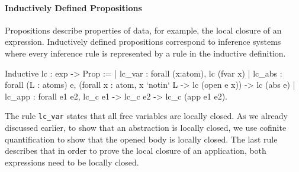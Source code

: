 \documentclass[a4paper, 11pt, fleqn]{scrreprt}
\newcommand{\coqinline}[1]{\texttt{#1}}
\begin{document}
	\paragraph{Inductively Defined Propositions}
	Propositions describe properties of data, for example, the local closure of an expression. Inductively defined propositions correspond to inference systems where every inference rule is represented by a rule in the inductive definition.
	\begin{coqcode}
Inductive lc : exp -> Prop :=
| lc_var : forall (x:atom), lc (fvar x)
| lc_abs : forall (L : atoms) e,
    (forall x : atom, 
       x `notin` L ->
       lc (open e x)) ->
    lc (abs e)
| lc_app : forall e1 e2,
    lc_c e1 -> lc_c e2 ->
    lc_c (app e1 e2).
	\end{coqcode}
	The rule \coqinline{lc_var} states that all free variables are locally closed. As we already discussed earlier, to show that an abstraction is locally closed, we use cofinite quantification to show that the opened body is locally closed. The last rule describes that in order to prove the local closure of an application, both expressions need to be locally closed.
\end{document}
